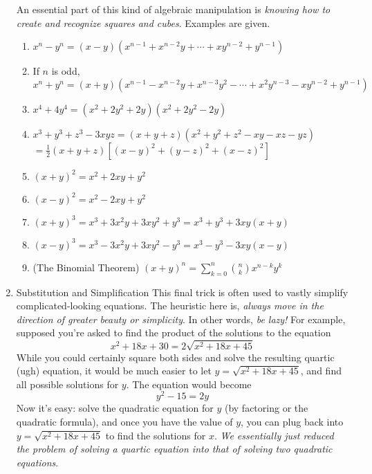 \documentclass{article}
\begin{document}
\begin{enumerate}[label=\Roman*.]
    An essential part of this kind of algebraic manipulation is \emph{knowing how to create and recognize squares and cubes}. Examples are given.
    \begin{enumerate}[label=(\alph*)]
    \item $x^n - y^n = (x-y)(x^{n-1}+x^{n-2}y + \cdots + xy^{n-2}+y^{n-1})$ 
    \item If $n$ is odd, $x^n + y^n=(x+y)(x^{n-1}-x^{n-2}y+x^{n-3}y^2-\cdots + x^2y^{n-3}-xy^{n-2}+y^{n-1})$
    \item $x^{4} + 4y^{4} = (x^2 + 2y^2 + 2y)(x^2 + 2y^2-2y)$ 
    \item $x^3 + y^3 + z^3 - 3xyz = (x + y + z)(x^2 + y^2 + z^2 -xy - xz - yz)$\\$ = \frac{1}{2}(x+y+z)\left[ (x-y)^2 + (y-z)^2 + (x-z)^2\right]$ 
    \item $(x+y)^2 =x^2+2xy+y^2$
    \item $(x-y)^2 = x^2 -2xy+y^2$
    \item $(x+y)^3 = x^3 + 3x^2y +3xy^2 + y^3 = x^3 + y^3 +3xy(x+y)$
    \item $(x-y)^3 = x^3 - 3x^2y+3xy^2-y^3 = x^3 - y^3 -3xy(x-y)$
    \item (The Binomial Theorem) $(x+y)^n = \sum_{k=0}^n \binom{n}{k} x^{n-k}y^k$
\end{enumerate}
    \item Substitution and Simplification
    This final trick is often used to vastly simplify complicated-looking equations. The heuristic here is, \emph{always move in the direction of greater beauty or simplicity}. In other words, \emph{be lazy!} For example, supposed you're asked to find the product of the solutions to the equation \begin{equation}x^2+18x+30 = 2\sqrt{x^2 + 18x + 45}\end{equation} While you could certainly square both sides and solve the resulting quartic (ugh) equation, it would be much easier to let $y=\sqrt{x^2 + 18x + 45}$, and find all possible solutions for $y$. The equation would become
    \[y^2-15 = 2y\]
    Now it's easy: solve the quadratic equation for $y$ (by factoring or the quadratic formula), and once you have the value of $y$, you can plug back into $y=\sqrt{x^2 + 18x + 45}$ to find the solutions for $x$. \emph{We essentially just reduced the problem of solving a quartic equation into that of solving two quadratic equations}.
\end{enumerate}
\end{document}
